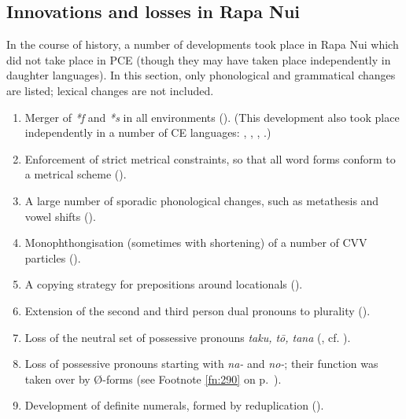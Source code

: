 \subsection{Innovations and losses in Rapa Nui}\label{sec:1.3.2}

In the course of history, a number of developments took place in Rapa Nui which did not take place in PCE (though they may have taken place independently in daughter languages). In this section, only phonological and grammatical changes are listed; lexical changes are not included.

\begin{enumerate}
\item 
Merger of \textit{*f} and \textit{*s} in all environments (). (This development also took place independently in a number of CE languages: , , , .)

\item 
Enforcement of strict metrical constraints, so that all word forms conform to a metrical scheme ().

\item 
A large number of sporadic phonological changes, such as metathesis and vowel shifts ().

\item 
Monophthongisation (sometimes with shortening) of a number of CVV particles ().

\item 
A copying strategy for prepositions around locationals ().

\item 
Extension of the second and third person dual pronouns to plurality ().

\item 
Loss of the neutral set of possessive pronouns \textit{taku, tō, tana} (\citealt{Wilson2012}, cf. ).

\item 
Loss of possessive pronouns starting with \textit{na-} and \textit{no-}; their function was taken over by Ø-forms (see Footnote \ref{fn:290} on p.~\pageref{fn:290}).

\item 
Development of definite numerals, formed by reduplication ().


\end{enumerate}

